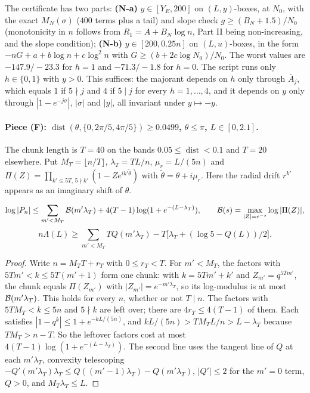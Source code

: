 The certificate has two parts: \textbf{(N-a)} $y\in[Y_E,200]$ on $(L,y)$-boxes, at $N_0$, with the exact $M_N(\sigma)$
($400$ terms plus a tail) and slope check $g\ge(B_N+1.5)/N_0$ (monotonicity in $n$ follows from $R_1=A+B_N\log n$, Part II
being non-increasing, and the slope condition); \textbf{(N-b)} $y\in[200,0.25n]$ on $(L,u)$-boxes, in the form
$-nG+a+b\log n+c\log^2n$ with $G\ge(b+2c\log N_0)/N_0$. The worst values are $-147.9/-23.3$ for $h=1$ and $-71.3/-1.8$
for $h=0$. The script runs only $h\in\{0,1\}$ with $y>0$. This suffices: the majorant depends on $h$ only through
$\bar A_j$, which equals $1$ if $5\nmid j$ and $4$ if $5\mid j$ for every $h=1,\dots,4$, and it depends on $y$ only through
$|1-e^{-j\sigma}|$, $|\sigma|$ and $|y|$, all invariant under $y\mapsto-y$.

\paragraph{Piece (F): $\operatorname{dist}(\theta,\{0,2\pi/5,4\pi/5\})\ge0.0499$, $\theta\le\pi$, $L\in[0,2.1]$.}
The chunk length is $T=40$ on the bands $0.05\le\operatorname{dist}<0.1$ and $T=20$ elsewhere. Put $M_T=\lfloor n/T\rfloor$,
$\lambda_T=TL/n$, $\mu_r=L/(5n)$ and $\Pi(Z)=\prod_{k'\le5T,\,5\nmid k'}(1-Ze^{ik'\tilde\theta})$ with
$\tilde\theta=\theta+i\mu_r$. Here the radial drift $r^{k'}$ appears as an imaginary shift of $\theta$.

\begin{lemma}\label{lem:chunk}
\[
\log|P_n|\le\sum_{m'<M_T}\mathcal B(m'\lambda_T)+4(T-1)\log(1+e^{-(L-\lambda_T)}),\qquad\mathcal B(s)=\max_{|Z|=e^{-s}}\log|\Pi(Z)|,
\]
\[
n\Lambda(L)\ge\sum_{m'<M_T}TQ(m'\lambda_T)-T\big[\lambda_T+(\log5-Q(L))/2\big].
\]
\end{lemma}
\begin{proof}
Write $n=M_TT+r_T$ with $0\le r_T<T$. For $m'<M_T$, the factors with $5Tm'<k\le5T(m'+1)$ form one chunk: with $k=5Tm'+k'$
and $Z_{m'}=q^{5Tm'}$, the chunk equals $\Pi(Z_{m'})$ with $|Z_{m'}|=e^{-m'\lambda_T}$, so its log-modulus is at most
$\mathcal B(m'\lambda_T)$. This holds for every $n$, whether or not $T\mid n$. The factors with $5TM_T<k\le5n$ and $5\nmid k$ are
left over; there are $4r_T\le4(T-1)$ of them. Each satisfies $|1-q^k|\le1+e^{-kL/(5n)}$, and $kL/(5n)>TM_TL/n>L-\lambda_T$
because $TM_T>n-T$. So the leftover factors cost at most $4(T-1)\log(1+e^{-(L-\lambda_T)})$. The second line uses the
tangent line of $Q$ at each $m'\lambda_T$, convexity telescoping $-Q'(m'\lambda_T)\lambda_T\le Q((m'-1)\lambda_T)-Q(m'\lambda_T)$,
$|Q'|\le2$ for the $m'=0$ term, $Q>0$, and $M_T\lambda_T\le L$.
\end{proof}

